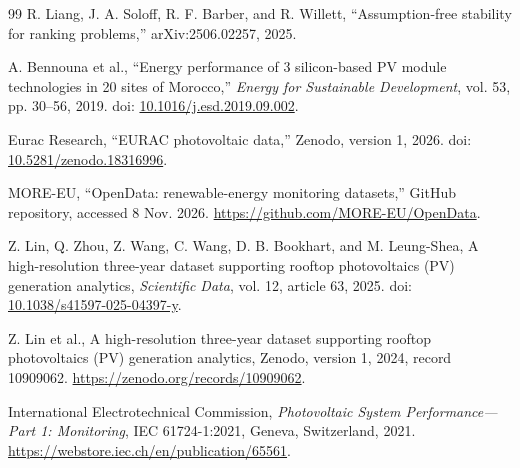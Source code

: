 \documentclass[preprint,12pt]{elsarticle}
\begin{document}
\begin{thebibliography}{99}
R. Liang, J. A. Soloff, R. F. Barber, and R. Willett, ``Assumption-free stability for ranking problems,'' arXiv:2506.02257, 2025.

A. Bennouna et al., ``Energy performance of 3 silicon-based PV module technologies in 20 sites of Morocco,'' \emph{Energy for Sustainable Development}, vol. 53, pp. 30--56, 2019. doi: \href{https://doi.org/10.1016/j.esd.2019.09.002}{10.1016/j.esd.2019.09.002}.

Eurac Research, ``EURAC photovoltaic data,'' Zenodo, version 1, 2026. doi: \href{https://doi.org/10.5281/zenodo.18316996}{10.5281/zenodo.18316996}.

MORE-EU, ``OpenData: renewable-energy monitoring datasets,'' GitHub repository, accessed 8 Nov. 2026. \url{https://github.com/MORE-EU/OpenData}.

Z. Lin, Q. Zhou, Z. Wang, C. Wang, D. B. Bookhart, and M. Leung-Shea, A high-resolution three-year dataset supporting rooftop photovoltaics (PV) generation analytics, \emph{Scientific Data}, vol. 12, article 63, 2025. doi: \href{https://doi.org/10.1038/s41597-025-04397-y}{10.1038/s41597-025-04397-y}.

Z. Lin et al., A high-resolution three-year dataset supporting rooftop photovoltaics (PV) generation analytics, Zenodo, version 1, 2024, record 10909062. \url{https://zenodo.org/records/10909062}.

International Electrotechnical Commission, \emph{Photovoltaic System Performance---Part 1: Monitoring}, IEC 61724-1:2021, Geneva, Switzerland, 2021. \url{https://webstore.iec.ch/en/publication/65561}.
\end{thebibliography}
\end{document}
